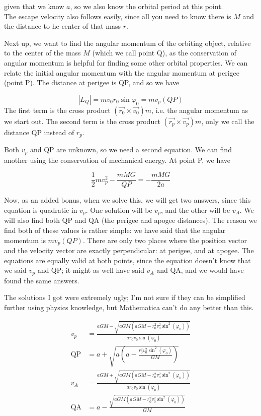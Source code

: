 given that we know $a$, so we also know the orbital period at this point.\\
The escape velocity also follows easily, since all you need to know there is $M$ and the distance to he center of that mass $r$.

Next up, we want to find the angular momentum of the orbiting object, relative to the center of the mass $M$ (which we call point Q), as the conservation of angular momentum is helpful for finding some other orbital properties. We can relate the initial angular momentum with the angular momentum at perigee (point P). The distance at perigee is QP, and so we have

\begin{equation}
|L_Q| = m v_0 r_0 \sin \varphi_0 = m v_p (QP)
\end{equation}
The first term is the cross product $(\vec{r_0} \times \vec {v_0}) m$, i.e. the angular momentum as we start out. The second term is the cross product $(\vec{r_p} \times \vec{v_p}) m$, only we call the distance QP instead of $r_p$.

Both $v_p$ and QP are unknown, so we need a second equation. We can find another using the conservation of mechanical energy. At point P, we have

\begin{equation}
\frac{1}{2} m v_p^2 - \frac{m M G}{QP} = - \frac{m M G}{2a}
\end{equation}

Now, as an added bonus, when we solve this, we will get two answers, since this equation is quadratic in $v_p$. One solution will be $v_p$, and the other will be $v_A$. We will also find both QP and QA (the perigee and apogee distances). The reason we find both of these values is rather simple: we have said that the angular momentum is $m v_p (QP)$. There are only two places where the position vector and the velocity vector are exactly perpendicular: at perigee, and at apogee. The equations are equally valid at both points, since the equation doesn't know that we said $v_p$ and QP; it might as well have said $v_A$ and QA, and we would have found the same answers.

The solutions I got were extremely ugly; I'm not sure if they can be simplified further using physics knowledge, but Mathematica can't do any better than this.

\begin{align}
v_p        &= \frac{a G M - \sqrt{a G M \left(a G M- r_0^2 v_0^2 \sin^2 (\varphi_0)\right)}}{a r_0 v_0 \sin (\varphi_0) }\\
\text{QP}  &= a + \sqrt{a\left(a - \frac{r_0^2 v_0^2 \sin^2(\varphi_0)}{G M}\right)}\\
v_A        &= \frac{a G M + \sqrt{a G M \left(a G M- r_0^2 v_0^2 \sin^2 (\varphi_0)\right)}}{a r_0 v_0 \sin (\varphi_0)}\\
\text{QA}  &= a - \frac{\sqrt{a G M(a G M - r_0^2 v_0^2 \sin^2(\varphi_0))}}{G M}
\end{align}

